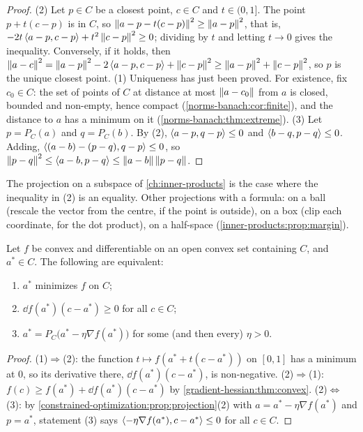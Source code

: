 \begin{notechapter}
\begin{proof}
(2) Let $p\in C$ be a closest point, $c\in C$ and $t\in(0, 1]$. The point
$p + t(c - p)$ is in $C$, so
$\left\|a - p - t(c - p)\right\|^2\geq\left\|a - p\right\|^2$, that is,
$-2t\left\langle a - p, c - p \right\rangle + t^2\left\|c - p\right\|^2\geq0$; dividing by $t$ and
letting $t\to0$ gives the inequality. Conversely, if it holds, then
$\left\|a - c\right\|^2 = \left\|a - p\right\|^2 - 2\left\langle a - p, c - p \right\rangle
+ \left\|c - p\right\|^2\geq\left\|a - p\right\|^2 + \left\|c - p\right\|^2$, so $p$ is the unique
closest point. (1) Uniqueness has just been proved. For existence, fix
$c_0\in C$: the set of points of $C$ at distance at most
$\left\|a - c_0\right\|$ from $a$ is closed, bounded and non-empty, hence
compact (\cref{norms-banach:cor:finite}), and the distance to $a$ has a
minimum on it (\cref{norms-banach:thm:extreme}). (3) Let $p = P_C(a)$ and
$q = P_C(b)$. By (2), $\left\langle a - p, q - p \right\rangle\leq0$ and
$\left\langle b - q, p - q \right\rangle\leq0$. Adding,
$\left\langle (a - b) - (p - q), q - p \right\rangle\leq0$, so
$\left\|p - q\right\|^2\leq\left\langle a - b, p - q \right\rangle\leq\left\|a - b\right\|\left\|p - q\right\|$.
\end{proof}

The projection on a subspace of \cref{ch:inner-products} is the case
where the inequality in (2) is an equality. Other projections with a
formula: on a ball (rescale the vector from the centre, if the point is
outside), on a box (clip
each coordinate, for the dot product), on a half-space
(\cref{inner-products:prop:margin}).

\begin{proposition}
\label{constrained-optimization:prop:optimality}
Let $f$ be convex and differentiable on an open convex set containing
$C$, and $a^*\in C$. The following are equivalent:
\begin{enumerate}[nosep]
  \item $a^*$ minimizes $f$ on $C$;
  \item $\dd f(a^*)(c - a^*)\geq0$ for all $c\in C$;
  \item $a^* = P_C\bigl(a^* - \eta\nabla f(a^*)\bigr)$ for some (and then
        every) $\eta > 0$.
\end{enumerate}
\end{proposition}

\begin{proof}
(1)$\Rightarrow$(2): the function $t\mapsto f(a^* + t(c - a^*))$ on
$[0, 1]$ has a minimum at $0$, so its derivative there,
$\dd f(a^*)(c - a^*)$, is non-negative. (2)$\Rightarrow$(1):
$f(c)\geq f(a^*) + \dd f(a^*)(c - a^*)$ by
\cref{gradient-hessian:thm:convex}. (2)$\Leftrightarrow$(3): by
\cref{constrained-optimization:prop:projection}(2) with
$a = a^* - \eta\nabla f(a^*)$ and $p = a^*$, statement (3) says
$\left\langle -\eta\nabla f(a^*), c - a^* \right\rangle\leq0$ for all $c\in C$.
\end{proof}


\end{notechapter}
